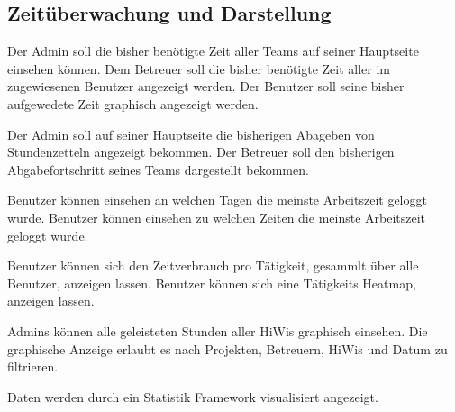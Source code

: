 \subsection{Zeitüberwachung und Darstellung}
    \begin{requirements}
        \begin{requirements}
             Der Admin soll die bisher benötigte Zeit aller Teams auf seiner Hauptseite einsehen können.
             Dem Betreuer soll die bisher benötigte Zeit aller im zugewiesenen Benutzer angezeigt werden.
             Der Benutzer soll seine bisher aufgewedete Zeit graphisch angezeigt werden.
        \end{requirements}

        \begin{requirements}
             Der Admin soll auf seiner Hauptseite die bisherigen Abageben von Stundenzetteln angezeigt bekommen.
             Der Betreuer soll den bisherigen Abgabefortschritt seines Teams dargestellt bekommen.
        \end{requirements}

        \begin{requirements}
             Benutzer können einsehen an welchen Tagen die meinste Arbeitszeit geloggt wurde.
             Benutzer können einsehen zu welchen Zeiten die meinste Arbeitszeit geloggt wurde.
        \end{requirements}

        \begin{requirements}
             Benutzer können sich den Zeitverbrauch pro Tätigkeit, gesammlt über alle Benutzer, anzeigen lassen.
             Benutzer können sich eine Tätigkeits Heatmap, anzeigen lassen.
        \end{requirements}
        
        \begin{requirements}
              Admins können alle geleisteten Stunden aller HiWis graphisch einsehen.
              Die graphische Anzeige erlaubt es nach Projekten, Betreuern, HiWis und Datum zu filtrieren.
        \end{requirements}

        Daten werden durch ein Statistik Framework visualisiert angezeigt.
    \end{requirements}

